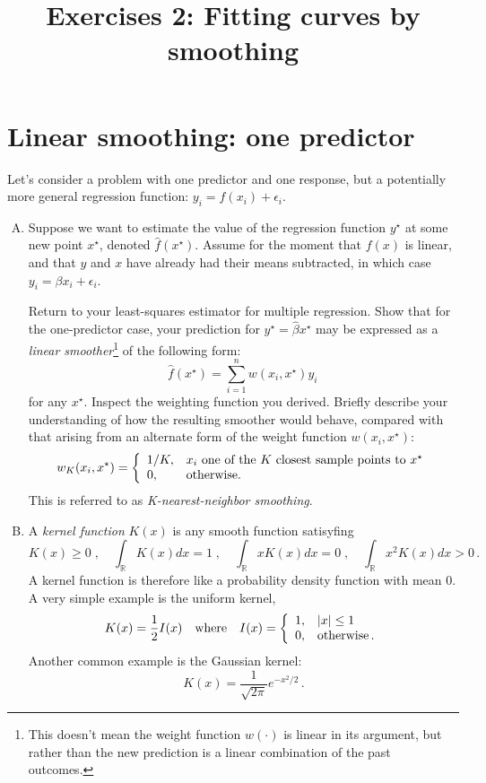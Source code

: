 \documentclass{mynotes}
\title[Exercises 2 $\cdot$ SSC 383D]{Exercises 2: Fitting curves by smoothing}
\date{}  %
\begin{document}
\maketitle%

\section{Linear smoothing: one predictor}

Let's consider a problem with one predictor and one response, but a potentially more general regression function: $y_i = f(x_i) + \epsilon_i$.

\begin{enumerate}[(A)]
\item Suppose we want to estimate the value of the regression function $y^{\star}$ at some new point $x^\star$, denoted $\hat{f}(x^{\star})$.  Assume for the moment that $f(x)$ is linear, and that $y$ and $x$ have already had their means subtracted, in which case $y_i = \beta x_i + \epsilon_i$.

Return to your least-squares estimator for multiple regression.  Show that for the one-predictor case, your prediction for $y^{\star} = \hat{\beta} x^{\star}$ may be expressed as a \textit{linear smoother}\footnote{This doesn't mean the weight function $w(\cdot)$ is linear in its argument, but rather than the new prediction is a linear combination of the past outcomes.} of the following form:
$$
\hat{f}(x^{\star}) = \sum_{i=1}^n w(x_i, x^{\star}) y_i \, 
$$
for any $x^{\star}$.  Inspect the weighting function you derived.  Briefly describe your understanding of how the resulting smoother would behave, compared with that arising from an alternate form of the weight function $w(x_i, x^{\star})$:
$$
w_K(x_i, x^{\star}) = \left \{
\begin{array}{l l}
1/K, & \mbox{$x_i$ one of the $K$ closest sample points to $x^{\star}$} \\
0, & \mbox{otherwise.} \\
\end{array}
\right.
$$
This is referred to as \textit{K-nearest-neighbor smoothing}.

\item A \textit{kernel function} $K(x)$ is any smooth function satisyfing
$$
K(x) \geq 0 \; , \quad \int_\mathbb{R} K(x) dx = 1 \; , \quad \int_\mathbb{R} x K(x) dx = 0 \; , \quad \int_\mathbb{R} x^2 K(x) dx > 0 \, .
$$
A kernel function is therefore like a probability density function with mean $0$.  A very simple example is the uniform kernel,
$$
K(x) = \frac{1}{2} I(x) \quad \mbox{where} \quad I(x) = 
\left\{
\begin{array}{l l}
1, & |x| \leq 1 \\
0, & \mbox{otherwise} \, . \\
\end{array}
\right.
$$
Another common example is the Gaussian kernel:
$$
K(x) = \frac{1}{\sqrt{2 \pi}} e^{-x^2/2} \, .
$$


\end{enumerate}
\end{document}
